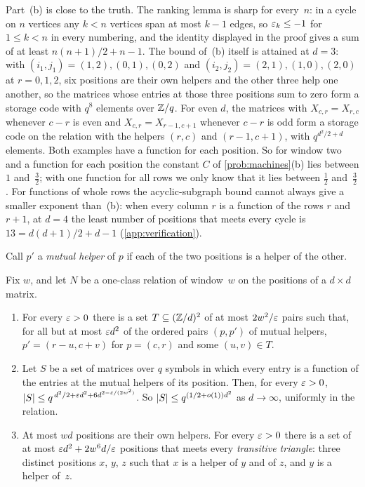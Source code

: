 Part~(b) is close to the truth. The ranking lemma is sharp for every~$n$: in a cycle on $n$ vertices any $k<n$
vertices span at most $k-1$ edges, so $\varepsilon_k\le-1$ for $1\le k<n$ in every numbering, and the identity displayed in
the proof gives a sum of at least $n(n+1)/2+n-1$. The bound of~(b) itself is attained at $d=3$: with
$(i_1,j_1)=(1,2),(0,1),(0,2)$ and $(i_2,j_2)=(2,1),(1,0),(2,0)$ at $r=0,1,2$, six positions are their own helpers
and the other three help one another, so the matrices whose entries at those three positions sum to zero form a
storage code with $q^8$ elements over $\mathbb{Z}/q$. For even $d$, the matrices with $X_{c,r}=X_{r,c}$ whenever $c-r$ is
even and $X_{c,r}=X_{r-1,c+1}$ whenever $c-r$ is odd form a storage code on the relation with the helpers $(r,c)$ and
$(r-1,c+1)$, with $q^{d^2/2+d}$ elements. Both examples have a function for each position. So for window two and
a function for each position the constant $C$ of \cref{prob:machines}(b) lies between $1$ and~$\tfrac32$; with one
function for all rows we only know that it lies between $\tfrac12$ and~$\tfrac32$. For functions of whole rows the
acyclic-subgraph bound cannot always give a smaller exponent than~(b): when every column $r$ is a function of the rows
$r$ and $r+1$, at $d=4$ the least number of positions that meets every cycle is $13=d(d+1)/2+d-1$
(\cref{app:verification}).

Call $p'$ a \emph{mutual helper} of $p$ if each of the two positions is a helper of the other.

\begin{proposition}\label{prop:mutual}
\notformalized
Fix $w$, and let $N$ be a one-class relation of window~$w$ on the positions of a $d\times d$ matrix.
\begin{enumerate}[label=(\alph*),leftmargin=2em]
\item For every $\varepsilon>0$ there is a set $T\subseteq(\mathbb{Z}/d)^2$ of at most $2w^2/\varepsilon$ pairs such that, for all but at
most $\varepsilon d^2$ of the ordered pairs $(p,p')$ of mutual helpers, $p'=(r-u,c+v)$ for $p=(c,r)$ and some $(u,v)\in T$.
\item Let $S$ be a set of matrices over $q$ symbols in which every entry is a function of the entries at the mutual
helpers of its position. Then, for every $\varepsilon>0$,
$\lvert S \rvert\le q^{\,d^2/2+\varepsilon d^2+6d^{2-\varepsilon/(2w^2)}}$. So $\lvert S \rvert\le q^{(1/2+o(1))d^2}$ as $d\to\infty$, uniformly in
the relation.
\item At most $wd$ positions are their own helpers. For every $\varepsilon>0$ there is a set of at most
$\varepsilon d^2+2w^6d/\varepsilon$ positions that meets every \emph{transitive triangle}: three distinct positions $x$, $y$, $z$
such that $x$ is a helper of $y$ and of $z$, and $y$ is a helper of~$z$.
\end{enumerate}
\end{proposition}

